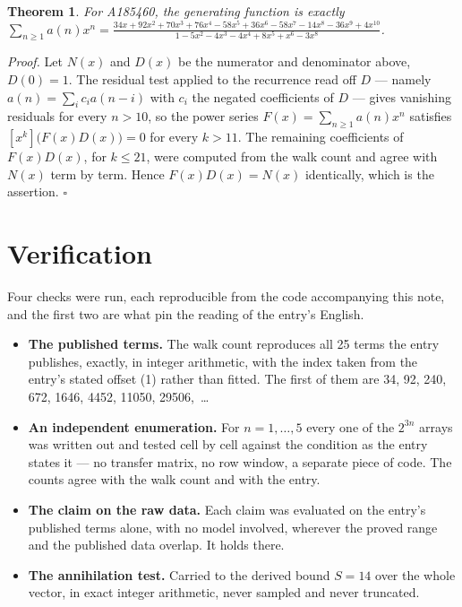 \documentclass[11pt]{article}
\newtheorem{theorem}{Theorem}
\theoremstyle{definition}
\begin{document}
\begin{theorem} For A185460, the generating function is exactly $\sum_{n\ge 1} a(n)x^n = \frac{34x + 92x^{2} + 70x^{3} + 76x^{4} - 58x^{5} + 36x^{6} - 58x^{7} - 14x^{8} - 36x^{9} + 4x^{10}}{1 - 5x^{2} - 4x^{3} - 4x^{4} + 8x^{5} + x^{6} - 3x^{8}}$.\end{theorem}

{\itshape Proof.} Let $N(x)$ and $D(x)$ be the numerator and denominator above, $D(0)=1$. The residual test applied to the recurrence read off $D$ --- namely $a(n) = \sum_i c_i a(n-i)$ with $c_i$ the negated coefficients of $D$ --- gives vanishing residuals for every $n > 10$, so the power series $F(x)=\sum_{n\ge 1}a(n)x^n$ satisfies $[x^k]\bigl(F(x)D(x)\bigr) = 0$ for every $k > 11$. The remaining coefficients of $F(x)D(x)$, for $k \le 21$, were computed from the walk count and agree with $N(x)$ term by term. Hence $F(x)D(x) = N(x)$ identically, which is the assertion. $\square$

\section{Verification}

Four checks were run, each reproducible from the code accompanying this note, and the first two are what pin the reading of the entry's English.

\begin{itemize}

\item {\bfseries The published terms.} The walk count reproduces all 25 terms the entry publishes, exactly, in integer arithmetic, with the index taken from the entry's stated offset (1) rather than fitted. The first of them are 34, 92, 240, 672, 1646, 4452, 11050, 29506,~\dots

\item {\bfseries An independent enumeration.} For $n = 1,\dots,5$ every one of the $2^{3n}$ arrays was written out and tested cell by cell against the condition as the entry states it --- no transfer matrix, no row window, a separate piece of code. The counts agree with the walk count and with the entry.

\item {\bfseries The claim on the raw data.} Each claim was evaluated on the entry's published terms alone, with no model involved, wherever the proved range and the published data overlap. It holds there.

\item {\bfseries The annihilation test.} Carried to the derived bound $S = 14$ over the whole vector, in exact integer arithmetic, never sampled and never truncated.

\end{itemize}
\end{document}
